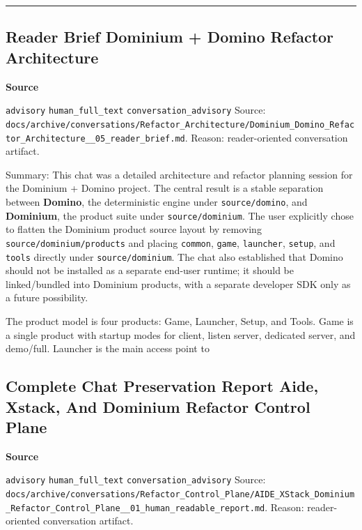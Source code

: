 \documentclass[9pt,a4paper,openany]{book}
\newcommand{\vonecallout}[3]{\par\medskip\noindent\begingroup\setlength{\fboxsep}{7pt}\colorbox{DomCalloutBg}{\parbox{0.94\linewidth}{\textbf{\textcolor{#1}{#2}}\par #3}}\endgroup\par\medskip}
\begin{document}
\par\medskip\hrule\medskip


\subsection{Reader Brief Dominium + Domino Refactor Architecture}

\vonecallout{DomSlate}{Source}{\texttt{advisory} \texttt{human\_\allowbreak{}full\_\allowbreak{}text} \texttt{conversation\_\allowbreak{}advisory} Source: \texttt{docs/\allowbreak{}archive/\allowbreak{}conversations/\allowbreak{}Refactor\_\allowbreak{}Architecture/\allowbreak{}Dominium\_\allowbreak{}Domino\_\allowbreak{}Refactor\_\allowbreak{}Architecture\_\allowbreak{}\_\allowbreak{}05\_\allowbreak{}reader\_\allowbreak{}brief.\allowbreak{}md}.\allowbreak{} Reason: reader-\allowbreak{}oriented conversation artifact.\allowbreak{}}

Summary: This chat was a detailed architecture and refactor planning session for the Dominium + Domino project.\allowbreak{} The central result is a stable separation between \textbf{Domino}, the deterministic engine under \texttt{source/\allowbreak{}domino}, and \textbf{Dominium}, the product suite under \texttt{source/\allowbreak{}dominium}.\allowbreak{} The user explicitly chose to flatten the Dominium product source layout by removing \texttt{source/\allowbreak{}dominium/\allowbreak{}products} and placing \texttt{common}, \texttt{game}, \texttt{launcher}, \texttt{setup}, and \texttt{tools} directly under \texttt{source/\allowbreak{}dominium}.\allowbreak{} The chat also established that Domino should not be installed as a separate end-\allowbreak{}user runtime; it should be linked/\allowbreak{}bundled into Dominium products, with a separate developer SDK only as a future possibility.\allowbreak{}


The product model is four products: Game, Launcher, Setup, and Tools.\allowbreak{} Game is a single product with startup modes for client, listen server, dedicated server, and demo/\allowbreak{}full.\allowbreak{} Launcher is the main access point to



\subsection{Complete Chat Preservation Report Aide, Xstack, And Dominium Refactor Control Plane}

\vonecallout{DomSlate}{Source}{\texttt{advisory} \texttt{human\_\allowbreak{}full\_\allowbreak{}text} \texttt{conversation\_\allowbreak{}advisory} Source: \texttt{docs/\allowbreak{}archive/\allowbreak{}conversations/\allowbreak{}Refactor\_\allowbreak{}Control\_\allowbreak{}Plane/\allowbreak{}AIDE\_\allowbreak{}XStack\_\allowbreak{}Dominium\_\allowbreak{}Refactor\_\allowbreak{}Control\_\allowbreak{}Plane\_\allowbreak{}\_\allowbreak{}01\_\allowbreak{}human\_\allowbreak{}readable\_\allowbreak{}report.\allowbreak{}md}.\allowbreak{} Reason: reader-\allowbreak{}oriented conversation artifact.\allowbreak{}}
\end{document}
